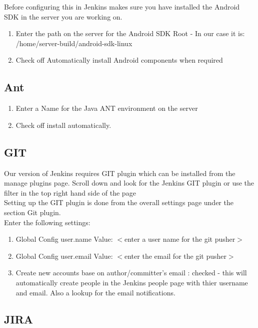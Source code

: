 Before configuring this in Jenkins makes sure you have installed the Android SDK in the server you are working on. 

\begin{enumerate}
\item Enter the path on the server for the Android SDK Root - In our case it is: /home/server-build/android-sdk-linux
\item Check off Automatically install Android components when required
\end{enumerate}
\subsection {Ant}
\begin{enumerate}
\item Enter a Name for the Java ANT environment on the server
\item Check off install automatically.
\end{enumerate}

\subsection{GIT}
Our version of Jenkins requires GIT plugin which can be installed from the manage plugins page.
Scroll down and look for the Jenkins GIT plugin  or use the filter in the top right hand side of the page\\

Setting up the GIT plugin is done from the overall settings page under the section Git plugin.\\

Enter the following settings:
\begin{enumerate}
\item Global Config user.name Value: $<$enter a user name for the git pusher$>$
\item Global Config user.email Value: $<$enter the email for the git pusher$>$
\item Create new accounts base on author/committer's email : checked - this will automatically create people in the Jenkins people page with thier username and email. Also a lookup for the email notifications.
\end{enumerate}
\subsection{JIRA}

